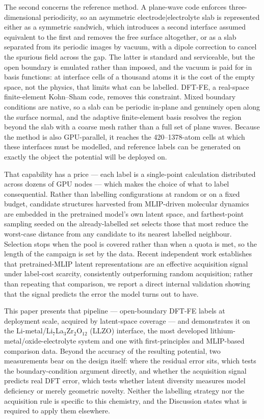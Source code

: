 \documentclass[11pt]{article}
\begin{document}
The second concerns the reference method. A plane-wave code enforces
three-dimensional periodicity, so an asymmetric electrode$|$electrolyte slab is
represented either as a symmetric sandwich, which introduces a second interface
assumed equivalent to the first and removes the free surface altogether, or as a
slab separated from its periodic images by vacuum, with a dipole correction to
cancel the spurious field across the gap. The latter is standard and
serviceable, but the open boundary is emulated rather than imposed, and the
vacuum is paid for in basis functions: at interface cells of a thousand atoms it
is the cost of the empty space, not the physics, that limits what can be
labelled. DFT-FE, a real-space finite-element Kohn--Sham
code\citep{dftfe,Das2022}, removes this constraint. Mixed boundary conditions
are native, so a slab can be periodic in-plane and genuinely open along the
surface normal, and the adaptive finite-element basis resolves the region beyond
the slab with a coarse mesh rather than a full set of plane waves. Because the
method is also GPU-parallel, it reaches the 420--1378-atom cells at which these
interfaces must be modelled, and reference labels can be generated on exactly
the object the potential will be deployed on.

That capability has a price --- each label is a single-point calculation
distributed across dozens of GPU nodes --- which makes the choice of what to
label consequential. Rather than labelling configurations at random or on a
fixed budget, candidate structures harvested from MLIP-driven molecular dynamics
are embedded in the pretrained model's own latent space, and farthest-point
sampling seeded on the already-labelled set selects those that most reduce the
worst-case distance from any candidate to its nearest labelled neighbour.
Selection stops when the pool is covered rather than when a quota is met, so the
length of the campaign is set by the data. Recent independent work establishes
that pretrained-MLIP latent representations are an effective acquisition signal
under label-cost scarcity, consistently outperforming random
acquisition\citep{vargaumbrich2026}; rather than repeating that comparison, we
report a direct internal validation showing that the signal predicts the error
the model turns out to have.

This paper presents that pipeline --- open-boundary DFT-FE labels at deployment
scale, acquired by latent-space coverage --- and demonstrates it on the
Li-metal/Li$_7$La$_3$Zr$_2$O$_{12}$ (LLZO) interface, the most developed
lithium-metal/oxide-electrolyte system and one with first-principles and
MLIP-based comparison data\citep{Iwasaki2022,Burov2024,Iwasaki2024}. Beyond the
accuracy of the resulting potential, two measurements bear on the design itself:
where the residual error sits, which tests the boundary-condition argument
directly, and whether the acquisition signal predicts real DFT error, which
tests whether latent diversity measures model deficiency or merely geometric
novelty. Neither the labelling strategy nor the acquisition rule is specific to
this chemistry, and the Discussion states what is required to apply them
elsewhere.
\end{document}
